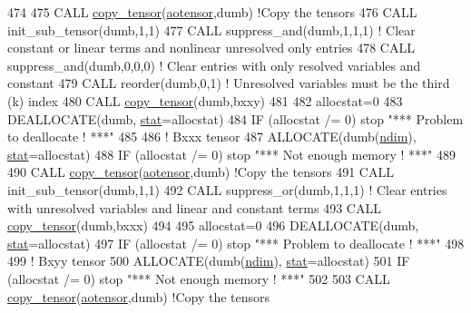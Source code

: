 \begin{DoxyCode}
474 
475     \textcolor{keyword}{CALL }\hyperlink{namespacetensor_a4a88ee8077278486c5128ad97617969e}{copy\_tensor}(\hyperlink{namespaceaotensor__def_a0dc43bc9294a18f2fe57b67489f1702f}{aotensor},dumb) \textcolor{comment}{!Copy the tensors}
476     \textcolor{keyword}{CALL }init\_sub\_tensor(dumb,1,1)
477     \textcolor{keyword}{CALL }suppress\_and(dumb,1,1,1) \textcolor{comment}{! Clear constant or linear terms and nonlinear unresolved only entries}
478     \textcolor{keyword}{CALL }suppress\_and(dumb,0,0,0) \textcolor{comment}{! Clear entries with only resolved variables and constant}
479     \textcolor{keyword}{CALL }reorder(dumb,0,1) \textcolor{comment}{! Unresolved variables must be the third (k) index}
480     \textcolor{keyword}{CALL }\hyperlink{namespacetensor_a4a88ee8077278486c5128ad97617969e}{copy\_tensor}(dumb,bxxy)
481 
482     allocstat=0
483     \textcolor{keyword}{DEALLOCATE}(dumb, \hyperlink{namespacestat}{stat}=allocstat)
484     \textcolor{keywordflow}{IF} (allocstat /= 0)  stop \textcolor{stringliteral}{"*** Problem to deallocate ! ***"}
485 
486     \textcolor{comment}{! Bxxx tensor}
487     \textcolor{keyword}{ALLOCATE}(dumb(\hyperlink{namespaceparams_a2323fe1773f086e20c14f266351c482b}{ndim}), \hyperlink{namespacestat}{stat}=allocstat)
488     \textcolor{keywordflow}{IF} (allocstat /= 0) stop \textcolor{stringliteral}{"*** Not enough memory ! ***"}
489 
490     \textcolor{keyword}{CALL }\hyperlink{namespacetensor_a4a88ee8077278486c5128ad97617969e}{copy\_tensor}(\hyperlink{namespaceaotensor__def_a0dc43bc9294a18f2fe57b67489f1702f}{aotensor},dumb) \textcolor{comment}{!Copy the tensors}
491     \textcolor{keyword}{CALL }init\_sub\_tensor(dumb,1,1)
492     \textcolor{keyword}{CALL }suppress\_or(dumb,1,1,1) \textcolor{comment}{! Clear entries with unresolved variables and linear and constant terms}
493     \textcolor{keyword}{CALL }\hyperlink{namespacetensor_a4a88ee8077278486c5128ad97617969e}{copy\_tensor}(dumb,bxxx)
494 
495     allocstat=0
496     \textcolor{keyword}{DEALLOCATE}(dumb, \hyperlink{namespacestat}{stat}=allocstat)
497     \textcolor{keywordflow}{IF} (allocstat /= 0)  stop \textcolor{stringliteral}{"*** Problem to deallocate ! ***"}
498 
499     \textcolor{comment}{! Bxyy tensor}
500     \textcolor{keyword}{ALLOCATE}(dumb(\hyperlink{namespaceparams_a2323fe1773f086e20c14f266351c482b}{ndim}), \hyperlink{namespacestat}{stat}=allocstat)
501     \textcolor{keywordflow}{IF} (allocstat /= 0) stop \textcolor{stringliteral}{"*** Not enough memory ! ***"}
502 
503     \textcolor{keyword}{CALL }\hyperlink{namespacetensor_a4a88ee8077278486c5128ad97617969e}{copy\_tensor}(\hyperlink{namespaceaotensor__def_a0dc43bc9294a18f2fe57b67489f1702f}{aotensor},dumb) \textcolor{comment}{!Copy the tensors}

\end{DoxyCode}
